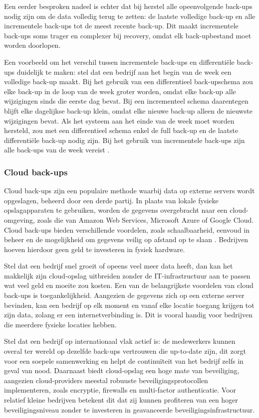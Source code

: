 Een eerder besproken nadeel is echter dat bij herstel alle opeenvolgende back-ups nodig zijn om de data volledig terug te zetten: de laatste volledige back-up en alle incrementele back-ups tot de meest recente back-up. Dit maakt incrementele back-ups soms trager en complexer bij recovery, omdat elk back-upbestand moet worden doorlopen. 

Een voorbeeld om het verschil tussen incrementele back-ups en differentiële back-ups duidelijk te maken: stel dat een bedrijf aan het begin van de week een volledige back-up maakt. Bij het gebruik van een differentieel back-upschema zou elke back-up in de loop van de week groter worden, omdat elke back-up alle wijzigingen sinds die eerste dag bevat. Bij een incrementeel schema daarentegen blijft elke dagelijkse back-up klein, omdat elke nieuwe back-up alleen de nieuwste wijzigingen bevat. Als het systeem aan het einde van de week moet worden hersteld, zou met een differentieel schema enkel de full back-up en de laatste differentiële back-up nodig zijn. Bij het gebruik van incrementele back-ups zijn alle back-ups van de week vereist \autocite{Beard2018}.

\subsubsection{Cloud back-ups}
Cloud back-ups zijn een populaire methode waarbij data op externe servers wordt opgeslagen, beheerd door een derde partij. In plaats van lokale fysieke opslagapparaten te gebruiken, worden de gegevens overgebracht naar een cloud-omgeving, zoals die van Amazon Web Services, Microsoft Azure of Google Cloud. Cloud back-ups bieden verschillende voordelen, zoals schaalbaarheid, eenvoud in beheer en de mogelijkheid om gegevens veilig op afstand op te slaan \autocite{Rahumed2011}. Bedrijven hoeven hierdoor geen geld te investeren in fysiek hardware. 

Stel dat een bedrijf snel groeit of opeens veel meer data heeft, dan kan het makkelijk zijn cloud-opslag uitbreiden zonder de IT-infrastructuur aan te passen wat veel geld en moeite zou kosten. Een van de belangrijkste voordelen van cloud back-ups is toegankelijkheid. Aangezien de gegevens zich op een externe server bevinden, kan een bedrijf op elk moment en vanaf elke locatie toegang krijgen tot zijn data, zolang er een internetverbinding is. Dit is vooral handig voor bedrijven die meerdere fysieke locaties hebben. 

Stel dat een bedrijf op internationaal vlak actief is: de medewerkers kunnen overal ter wereld op dezelfde back-ups vertrouwen die up-to-date zijn, dit zorgt voor een soepele samenwerking en helpt de continuïteit van het bedrijf zelfs in geval van nood. Daarnaast biedt cloud-opslag een hoge mate van beveiliging, aangezien cloud-providers meestal robuuste beveiligingsprotocollen implementeren, zoals encryptie, firewalls en multi-factor authenticatie. Voor relatief kleine bedrijven betekent dit dat zij kunnen profiteren van een hoger beveiligingsniveau zonder te investeren in geavanceerde beveiligingsinfrastructuur. 

